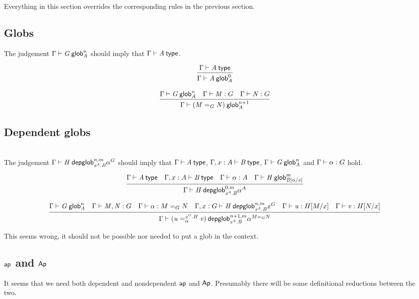 Everything in this section overrides the corresponding rules in the previous
section.

\subsection{Globs}

The judgement $\text{\ensuremath{\Gamma}} \vdash \mathit{G} \: \mathsf{glob}^{n}_{\mathit{A}}$ should imply that
$\text{\ensuremath{\Gamma}} \vdash \mathit{A} \: \mathsf{type}$.

\begin{small}
  \[\infer{\wfglob{\Gamma}{A}{0}{A}} {\wftype{\Gamma}{A}}\]

  \[\infer{\wfglob{\Gamma}{(\homj{G}{M}{N})}{n+1}{A}} {\wfglob{\Gamma}{G}{n}{A}
    & \ofglob{\Gamma}{M}{G} & \ofglob{\Gamma}{N}{G}}\]
\end{small}

\subsection{Dependent globs}

\\

The judgement $\text{\ensuremath{\Gamma}} \vdash \mathit{H} \: \mathsf{depglob}^{n,m}_{\mathit{x^A.B}}\alpha^G$ should imply that
$\text{\ensuremath{\Gamma}} \vdash \mathit{A} \: \mathsf{type}$, $\text{\ensuremath{\Gamma,x:A}} \vdash \mathit{B} \: \mathsf{type}$, $\text{\ensuremath{\Gamma}} \vdash \mathit{G} \: \mathsf{glob}^{n}_{\mathit{A}}$ and
$\text{\ensuremath{\Gamma}} \vdash \mathit{\alpha} : {G}$ hold.

\begin{small}
  \[\infer{\wfdepglob{\Gamma}{H}{0,m}{x^A.B}\alpha^A}
  {\wftype{\Gamma}{A}
    & \wftype{\Gamma,x:A}{B}
    & \ofglob{\Gamma}{\alpha}{A}
    & \wfglob{\Gamma}{H}{m}{B[\alpha/x]}
  }\]

  \[\infer{\wfdepglob{\Gamma}{(\dhomj{x^G.H}{u}{v}{\alpha})}{n+1,m}
    {x^A.B}\alpha^{\homj{G}{M}{N}}} {\wfglob{\Gamma}{G}{n}{A} &
    \ofglob{\Gamma}{M,N}{G}
    & \ofglob{\Gamma}{\alpha}{\homj{G}{M}{N}} \\
    & \wfdepglob{\Gamma,x:G}{H}{n,m}{x^A.B}x^G & \ofglob{\Gamma}{u}{H[M/x]} &
    \ofglob{\Gamma}{v}{H[N/x]} }\]
\end{small}

This seems wrong, it should not be possible nor needed to put a glob in the
context.

\subsection{$\mathsf{ap}$ and $\mathsf{Ap}$}

It seems that we need both dependent and nondependent $\mathsf{ap}$ and
$\mathsf{Ap}$. Presumably there will be some definitional reductions between the
two.


